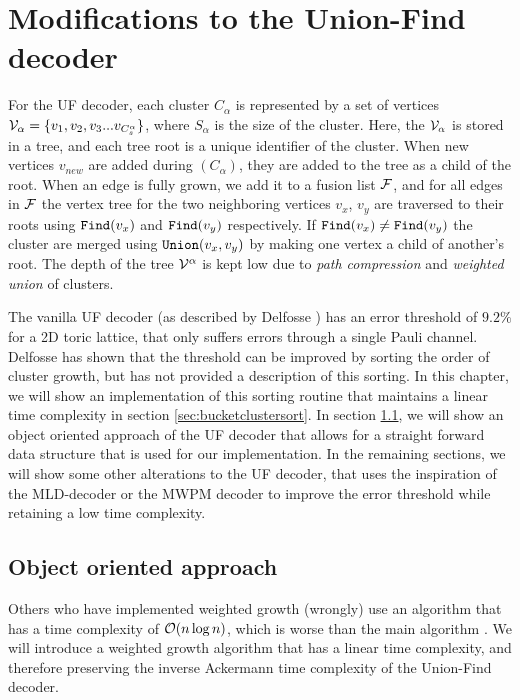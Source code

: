 \chapter{Modifications to the Union-Find decoder}

For the UF decoder, each cluster $C_\alpha$ is represented by a set of vertices $\mathcal{V}_\alpha = \{v_1, v_2, v_3 ... v_{C^\alpha_s}\}$, where $S_\alpha$ is the size of the cluster. Here, the $\mathcal{V}_\alpha$ is stored in a tree, and each tree root is a unique identifier of the cluster. When new vertices $v_{new}$ are added during $(C_\alpha)$, they are added to the tree as a child of the root. When an edge is fully grown, we add it to a fusion list $\mathcal{F}$, and for all edges in $\mathcal{F}$ the vertex tree for the two neighboring vertices $v_x$, $v_y$ are traversed to their roots using $\texttt{Find}(v_x)$ and $\texttt{Find}(v_y)$ respectively. If $\texttt{Find}(v_x) \neq \texttt{Find}(v_y)$ the cluster are merged using $\texttt{Union}(v_x, v_y)$ by making one vertex a child of another's root. The depth of the tree $\mathcal{V}^\alpha$ is kept low due to \emph{path compression} and \emph{weighted union} of clusters.

The vanilla UF decoder (as described by Delfosse \cite{delfosse2017almost}) has an error threshold of $9.2\%$ for a 2D toric lattice, that only suffers errors through a single Pauli channel. Delfosse has shown that the threshold can be improved by sorting the order of cluster growth, but has not provided a description of this sorting. In this chapter, we will show an implementation of this sorting routine that maintains a linear time complexity in section \ref{sec:bucketclustersort}. In section \ref{sec:oop}, we will show an object oriented approach of the UF decoder that allows for a straight forward data structure that is used for our implementation. In the remaining sections, we will show some other alterations to the UF decoder, that uses the inspiration of the MLD-decoder or the MWPM decoder to improve the error threshold while retaining a low time complexity.

\section{Object oriented approach}\label{sec:oop}

Others who have implemented weighted growth (wrongly) use an algorithm that has a time complexity of $\mathcal{O}(n\log n)$, which is worse than the main algorithm \cite{nando}. We will introduce a weighted growth algorithm that has a linear time complexity, and therefore preserving the inverse Ackermann time complexity of the Union-Find decoder.

